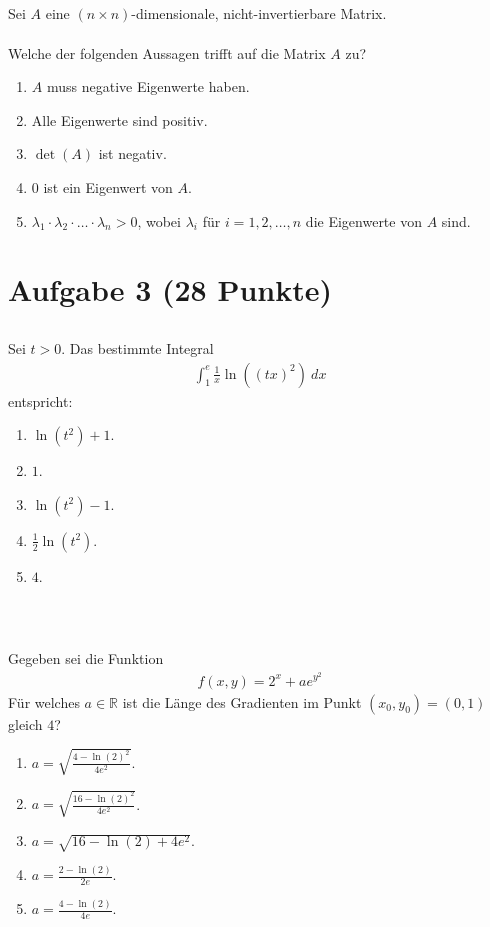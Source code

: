 \subsection*{}
Sei $A$ eine $(n \times n)$-dimensionale, nicht-invertierbare Matrix.\\
\\
Welche der folgenden Aussagen trifft auf die Matrix $A$ zu?
\renewcommand{\labelenumi}{(\alph{enumi})}
\begin{enumerate}
	\item 
	$A$ muss negative Eigenwerte haben.
	\item
	Alle Eigenwerte sind positiv.
	\item
	$\det(A)$ ist negativ.
	\item
	$0$ ist ein Eigenwert von $A$.
	\item 
	$\lambda_1 \cdot \lambda_2 \cdot \dots \cdot \lambda_n > 0 $, wobei $\lambda_i$ für $i = 1,2,\dots,n$ die Eigenwerte von $A$ sind.
\end{enumerate}

\newpage
\section*{Aufgabe 3 (28 Punkte)}
\vspace{0.4cm}

\subsection*{}
Sei $t > 0$. Das bestimmte Integral
\begin{align*}
	\int_1^e \frac{1}{x} \ln\left((tx)^2\right) \ dx
\end{align*}
entspricht:
\renewcommand{\labelenumi}{(\alph{enumi})}
\begin{enumerate}
\item 
$ \ln(t^2)  +1  $.
\item
$ 1 $.
\item
$ \ln(t^2) -1 $.
\item 
$\frac{1}{2} \ln(t^2)$.
\item $4$.
\end{enumerate}
\ \\
\subsection*{}
Gegeben sei die Funktion
\begin{align*}
	f(x,y) = 2^x +  a e^{y^2}
\end{align*}
Für welches $a \in \mathbb{R}$ ist die Länge des Gradienten im Punkt $(x_0,y_0) = (0,1)$ gleich $4$?
\renewcommand{\labelenumi}{(\alph{enumi})}
\begin{enumerate}
	\item 
	$a = \sqrt{\frac{4 - \ln(2)^2}{4 e^2}} $.
	\item
	$a = \sqrt{\frac{16 - \ln(2)^2}{4 e^2}}$.
	\item
	$a = \sqrt{16 - \ln(2) + 4 e^2}$.
	\item
	$a = \frac{2 - \ln(2)}{2 e }$.
	\item 
	$a = \frac{4 - \ln(2)}{4e}$.
\end{enumerate}
\newpage
